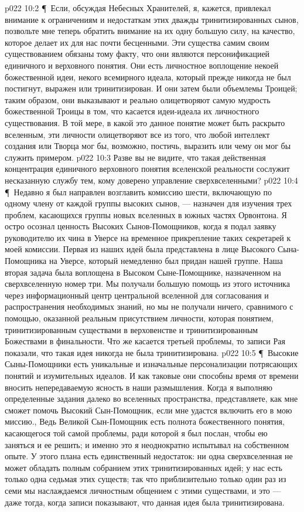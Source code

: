 \vs p022 10:2 \P\ Если, обсуждая Небесных Хранителей, я, кажется, привлекал внимание к ограничениям и недостаткам этих дважды тринитизированных сынов, позвольте мне теперь обратить внимание на их одну большую силу, на качество, которое делает их для нас почти бесценными. Эти существа самим своим существованием обязаны тому факту, что они являются персонификацией единичного и верховного понятия. Они есть личностное воплощение некоей божественной идеи, некого всемирного идеала, который прежде никогда не был постигнут, выражен или тринитизирован. И они затем были объемлемы Троицей; таким образом, они выказывают и реально олицетворяют самую мудрость божественной Троицы в том, что касается идеи\hyp{}идеала их личностного существования. В той мере, в какой это данное понятие может быть раскрыто вселенным, эти личности олицетворяют все из того, что любой интеллект создания или Творца мог бы, возможно, постичь, выразить или чему он мог бы служить примером. 
\vs p022 10:3 Разве вы не видите, что такая действенная концентрация единичного верховного понятия вселенской реальности сослужит несказанную службу тем, кому доверено управление сверхвселенными?
\vs p022 10:4 \P\ Недавно я был направлен возглавить комиссию шести, включающую по одному члену от каждой группы высоких сынов, --- назначен для изучения трех проблем, касающихся группы новых вселенных в южных частях Орвонтона. Я остро осознал ценность Высоких Сынов\hyp{}Помощников, когда я подал заявку руководителю их чина в Уверсе на временное прикрепление таких секретарей к моей комиссии. Первая из наших идей была представлена в лице Высокого Сына\hyp{}Помощника на Уверсе, который немедленно был придан нашей группе. Наша вторая задача была воплощена в Высоком Сыне\hyp{}Помощнике, назначенном на сверхвселенную номер три. Мы получали большую помощь из этого источника через информационный центр центральной вселенной для согласования и распространения необходимых знаний, но мы не получали ничего, сравнимого с помощью, оказанной реальным присутствием личности, которая  понятием, тринитизированным существами в верховенстве и тринитизированным Божествами в финальности. Что же касается третьей проблемы, то записи Рая показали, что такая идея никогда не была тринитизирована.
\vs p022 10:5 \P\ Высокие Сыны\hyp{}Помощники есть уникальные и изначальные персонализации потрясающих понятий и изумительных идеалов. И как таковые они способны время от времени вносить непередаваемую ясность в наши размышления. Когда я выполняю определенные задания далеко во вселенных пространства, представляете, как мне сможет помочь Высокий Сын\hyp{}Помощник, если мне удастся включить его в мою миссию., Ведь Великой Сын\hyp{}Помощник есть полнота божественного понятия, касающегося той самой проблемы, ради которой я был послан, чтобы ею заняться и ее решить; и именно это я неоднократно испытывал на собственном опыте. У этого плана есть единственный недостаток: ни одна сверхвселенная не может обладать полным собранием этих тринитизированных идей; у нас есть только одна седьмая этих существ; так что приблизительно только один раз из семи мы наслаждаемся личностным общением с этими существами, и это --- даже тогда, когда записи показывают, что данная идея была тринитизирована.
